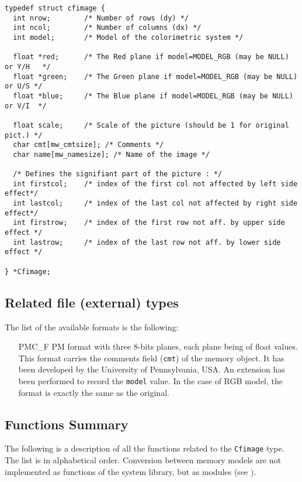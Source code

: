 {\small
\begin{verbatim}
typedef struct cfimage {
  int nrow;        /* Number of rows (dy) */
  int ncol;        /* Number of columns (dx) */
  int model;       /* Model of the colorimetric system */

  float *red;      /* The Red plane if model=MODEL_RGB (may be NULL) or Y/H   */
  float *green;    /* The Green plane if model=MODEL_RGB (may be NULL) or U/S */
  float *blue;     /* The Blue plane if model=MODEL_RGB (may be NULL) or V/I  */

  float scale;     /* Scale of the picture (should be 1 for original pict.) */
  char cmt[mw_cmtsize]; /* Comments */
  char name[mw_namesize]; /* Name of the image */
  
  /* Defines the signifiant part of the picture : */
  int firstcol;    /* index of the first col not affected by left side effect*/
  int lastcol;     /* index of the last col not affected by right side effect*/
  int firstrow;    /* index of the first row not aff. by upper side effect */  
  int lastrow;     /* index of the last row not aff. by lower side effect */  

} *Cfimage;
\end{verbatim}
}

\subsection{Related file (external) types}
\label{images_color-float-file_type}

The list of the available formats is the following:
\begin{enumerate}
\item[PMC\_F] 
PM format with three 8-bits planes, each plane being of float values.
This format carries the comments field (\verb+cmt+) of the memory object.
It has been developed by the University of Pennsylvania, USA.
An extension has been performed to record the \verb+model+ value.
In the case of RGB model, the format is exactly the same as the original.
\end{enumerate}

\subsection{Functions Summary}
\label{images_color-float-images_function}

The following is a description of all the functions related to 
the \verb+Cfimage+ type. The list is in alphabetical order.
Conversion between memory models are not implemented as functions of
the system library, but as modules (see \volIII). 

\newpage %



